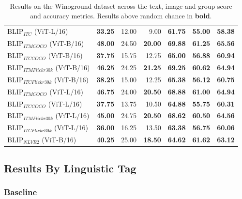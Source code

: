 \begin{table}[ht]
\begin{tabular}{l|rrr|rrr}
 BLIP$_{ITC}$ (ViT-L/16)             & \textbf{33.25} & 12.00          & 9.00           & \textbf{61.75} & \textbf{55.00} & \textbf{58.38} \\
 BLIP$_{ITM COCO}$ (ViT-B/16)        & \textbf{48.00} & 24.50          & \textbf{20.00} & \textbf{69.88} & \textbf{61.25} & \textbf{65.56} \\
 BLIP$_{ITC COCO}$ (ViT-B/16)        & \textbf{37.75} & 15.75          & 12.75          & \textbf{65.00} & \textbf{56.88} & \textbf{60.94} \\
 BLIP$_{ITM Flickr30k}$ (ViT-B/16)   & \textbf{46.25} & 24.25          & \textbf{21.25} & \textbf{69.25} & \textbf{60.62} & \textbf{64.94} \\
 BLIP$_{ITC Flickr30k}$ (ViT-B/16)   & \textbf{38.25} & 15.00          & 12.25          & \textbf{65.38} & \textbf{56.12} & \textbf{60.75} \\
 BLIP$_{ITM COCO}$ (ViT-L/16)        & \textbf{46.75} & 24.00          & \textbf{20.50} & \textbf{68.88} & \textbf{61.00} & \textbf{64.94} \\
 BLIP$_{ITC COCO}$ (ViT-L/16)        & \textbf{37.75} & 13.75          & 10.50          & \textbf{64.88} & \textbf{55.75} & \textbf{60.31} \\
 BLIP$_{ITM Flickr30k}$ (ViT-L/16)   & \textbf{45.00} & 24.75          & \textbf{20.50} & \textbf{68.62} & \textbf{60.50} & \textbf{64.56} \\
 BLIP$_{ITC Flickr30k}$ (ViT-L/16)   & \textbf{36.00} & 16.25          & 13.50          & \textbf{63.38} & \textbf{56.75} & \textbf{60.06} \\
 BLIP$_{NLVR2}$ (ViT-B/16)           & \textbf{40.25} & 25.00          & \textbf{18.50} & \textbf{64.62} & \textbf{61.62} & \textbf{63.12} \\
\bottomrule
\end{tabular}
\caption{Results on the Winoground dataset across the text, image and group score and accuracy metrics. Results above random chance in \textbf{bold}.}
\label{tab:results_aggr_ours}
\end{table}

\subsection{Results By Linguistic Tag}

\subsubsection{Baseline}

